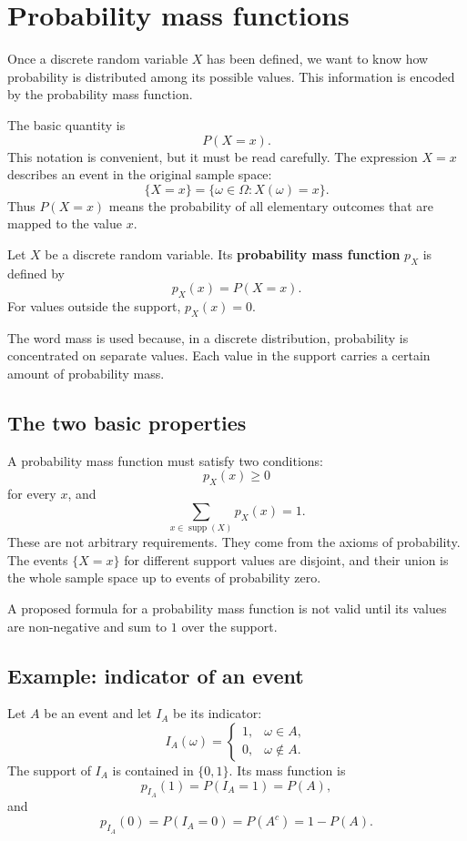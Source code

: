 \section{Probability mass functions}

Once a discrete random variable \(X\) has been defined, we want to know how
probability is distributed among its possible values. This information is encoded
by the probability mass function.

The basic quantity is
\[
P(X=x).
\]
This notation is convenient, but it must be read carefully. The expression
\(X=x\) describes an event in the original sample space:
\[
\{X=x\}=\{\omega\in\Omega:X(\omega)=x\}.
\]
Thus \(P(X=x)\) means the probability of all elementary outcomes that are mapped
to the value \(x\).

\begin{definitionbox}
Let \(X\) be a discrete random variable. Its \textbf{probability mass function}
\(p_X\) is defined by
\[
p_X(x)=P(X=x).
\]
For values outside the support, \(p_X(x)=0\).
\end{definitionbox}

The word mass is used because, in a discrete distribution, probability is
concentrated on separate values. Each value in the support carries a certain
amount of probability mass.

\subsection*{The two basic properties}

A probability mass function must satisfy two conditions:
\[
p_X(x)\geq 0
\]
for every \(x\), and
\[
\sum_{x\in\operatorname{supp}(X)}p_X(x)=1.
\]
These are not arbitrary requirements. They come from the axioms of probability.
The events \(\{X=x\}\) for different support values are disjoint, and their union
is the whole sample space up to events of probability zero.

\begin{remarkbox}
A proposed formula for a probability mass function is not valid until its values
are non-negative and sum to \(1\) over the support.
\end{remarkbox}

\subsection*{Example: indicator of an event}

Let \(A\) be an event and let \(I_A\) be its indicator:
\[
I_A(\omega)=
\begin{cases}
1, & \omega\in A,\\
0, & \omega\notin A.
\end{cases}
\]
The support of \(I_A\) is contained in \(\{0,1\}\). Its mass function is
\[
p_{I_A}(1)=P(I_A=1)=P(A),
\]
and
\[
p_{I_A}(0)=P(I_A=0)=P(A^c)=1-P(A).
\]

